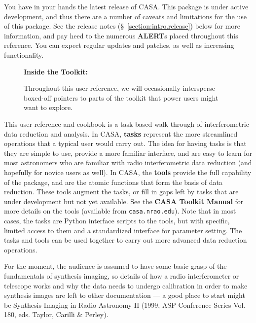You have in your hands the latest release of CASA.  This package is
under active development, and thus there are a number of caveats and
limitations for the use of this 
package.  See the release notes (\S~\ref{section:intro.release})
below for more information,
and pay heed to the numerous {\bf ALERT}s placed throughout this
reference.  You can expect regular updates and patches, as well as
increasing functionality.

\begin{wrapfigure}{r}{2.5in}
  \begin{boxedminipage}{2.5in}
     \centerline{\bf Inside the Toolkit:}
     Throughout this user reference, we will occasionally intersperse
     boxed-off pointers to parts of the toolkit that power users might
     want to explore.  
  \end{boxedminipage}
\end{wrapfigure}

This user reference and cookbook is a task-based walk-through of
interferometric data reduction and analysis. In CASA, {\bf tasks}
represent the more streamlined operations that a typical user would
carry out. The idea for having tasks is that they are simple to use,
provide a more familiar interface, and are easy to learn for most
astronomers who are familiar with radio interferometric data reduction
(and hopefully for novice users as well). In CASA, the {\bf tools}
provide the full capability of the package, and are the atomic
functions that form the basis of data reduction.  These tools augment
the tasks, or fill in gaps left by tasks that are under development
but not yet available. See the {\bf CASA Toolkit Manual} for more
details on the tools (available from \verb=casa.nrao.edu=).  Note that
in most cases, the tasks are Python interface scripts to the tools,
but with specific, limited access to them and a standardized interface
for parameter setting.  The tasks and tools can be used together to
carry out more advanced data reduction operations.

For the moment, the audience is assumed to have some basic grasp of
the fundamentals of synthesis imaging, so details of how a radio
interferometer or telescope works and why the data needs to undergo
calibration in order to make synthesis images are left to other
documentation --- a good place to start might be Synthesis Imaging in
Radio Astronomy II (1999, ASP Conference Series Vol. 180, eds. Taylor,
Carilli \& Perley).

